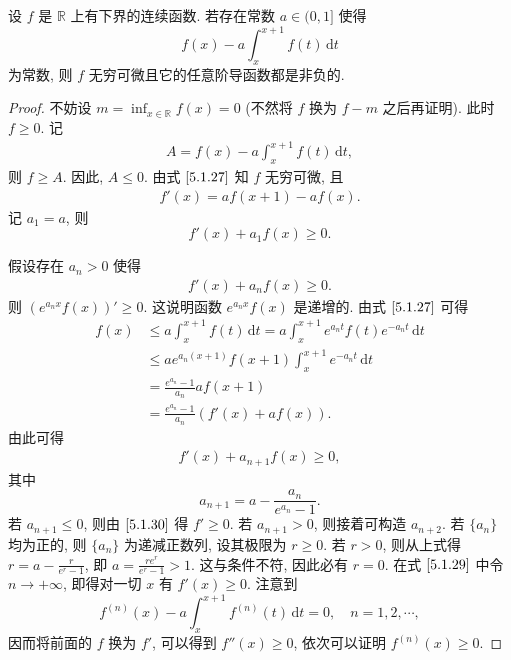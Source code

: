 \documentclass[../../main.tex]{subfiles}
\begin{document}
\begin{example}
设 \( f \) 是 \( \mathbb{R} \) 上有下界的连续函数. 若存在常数 \( a \in (0,1] \) 使得  
\[
f(x) - a \int_{x}^{x + 1} f(t) \, \mathrm{d}t
\]  
为常数, 则 \( f \) 无穷可微且它的任意阶导函数都是非负的.  
\end{example}
\begin{proof}
不妨设 \( m = \inf_{x \in \mathbb{R}} f(x) = 0 \) (不然将 \( f \) 换为 \( f - m \) 之后再证明). 此时 \( f \geq 0 \). 记  
\begin{align}
A = f(x) - a \int_{x}^{x + 1} f(t) \, \mathrm{d}t, \label{5.1.27}
\end{align}
则 \( f \geq A \). 因此, \( A \leq 0 \). 由式 \(\eqref{5.1.27}\) 知 \( f \) 无穷可微, 且  
\begin{align}
f'(x) = a f(x + 1) - a f(x). \label{5.1.28}
\end{align}  
记 \( a_1 = a \), 则  
\[
f'(x) + a_1 f(x) \geq 0.
\]  

假设存在 \( a_n > 0 \) 使得  
\begin{align}
f'(x) + a_n f(x) \geq 0. \label{5.1.29}
\end{align}  
则 \( (e^{a_n x} f(x))' \geq 0 \). 这说明函数 \( e^{a_n x} f(x) \) 是递增的. 由式 \(\eqref{5.1.27}\) 可得  
\[
\begin{aligned}
f(x) &\leq a \int_{x}^{x + 1} f(t) \, \mathrm{d}t = a \int_{x}^{x + 1} e^{a_n t} f(t) e^{-a_n t} \, \mathrm{d}t \\
&\leq a e^{a_n (x + 1)} f(x + 1) \int_{x}^{x + 1} e^{-a_n t} \, \mathrm{d}t \\
&= \frac{e^{a_n} - 1}{a_n} a f(x + 1) \\
&= \frac{e^{a_n} - 1}{a_n} (f'(x) + a f(x)).
\end{aligned}
\]  
由此可得  
\begin{align}
f'(x) + a_{n + 1} f(x) \geq 0, \label{5.1.30}
\end{align}  
其中  
\[
a_{n + 1} = a - \frac{a_n}{e^{a_n} - 1}.
\]  
若 \( a_{n + 1} \leq 0 \), 则由 \(\eqref{5.1.30}\) 得 \( f' \geq 0 \). 若 \( a_{n + 1} > 0 \), 则接着可构造 \( a_{n + 2} \). 若 \( \{a_n\} \) 均为正的, 则 \( \{a_n\} \) 为递减正数列, 设其极限为 \( r \geq 0 \). 若 \( r > 0 \), 则从上式得 \( r = a - \frac{r}{e^r - 1} \), 即 \( a = \frac{r e^r}{e^r - 1} > 1 \). 这与条件不符, 因此必有 \( r = 0 \). 在式 \(\eqref{5.1.29}\) 中令 \( n \to +\infty \), 即得对一切 \( x \) 有 \( f'(x) \geq 0 \). 注意到  
\[
f^{(n)}(x) - a \int_{x}^{x + 1} f^{(n)}(t) \, \mathrm{d}t = 0, \quad n = 1, 2, \cdots,
\]  
因而将前面的 \( f \) 换为 \( f' \), 可以得到 \( f''(x) \geq 0 \), 依次可以证明 \( f^{(n)}(x) \geq 0 \).
\end{proof}
\end{document}
